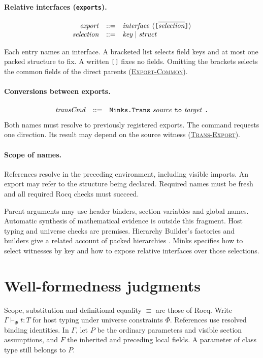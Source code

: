 \documentclass{article}
\newcommand{\ttt}[1]{\texttt{#1}}
\newcommand{\ruse}[1]{\hyperlink{rule-#1}{\textsc{#1}}}
\begin{document}
\paragraph{Relative interfaces (\texttt{exports}).}

\[
\begin{array}{@{}rcl@{}}
\grammarExport\\
\grammarSelection
\end{array}
\]

Each entry names an interface. A bracketed list selects field keys and
at most one packed structure to fix. A written \ttt{[]} fixes no fields.
Omitting the brackets selects the common fields of the direct parents
(\ruse{Export-Common}).

\paragraph{Conversions between exports.}
\[
\begin{array}{@{}rcl@{}}
\grammarTrans
\end{array}
\]
Both names must resolve to previously registered exports. The command
requests one direction. Its result may depend on the source witness
(\ruse{Trans-Export}).

\paragraph{Scope of names.}

References resolve in the preceding environment, including visible imports.
An export may refer to the structure being declared. Required names must
be fresh and all required Rocq checks must succeed.

Parent arguments may use header binders, section variables and global names.
Automatic synthesis of mathematical evidence is outside this fragment. Host typing and universe checks are premises.
Hierarchy Builder's factories and builders give a related account of
packed hierarchies \cite{hb}. Minks specifies how to select witnesses
by key and how to expose relative interfaces over those selections.

\section{Well-formedness judgments}
\label{sec:wf}

Scope, substitution and definitional equality $\equiv$ are those of Rocq.
Write $\Gamma\vdash_\Phi t:T$ for host typing under universe constraints
$\Phi$. References use resolved binding identities. In $\Gamma$, let
$P$ be the ordinary parameters and visible section assumptions, and
$F$ the inherited and preceding local fields. A parameter of class type
still belongs to $P$.
\end{document}
